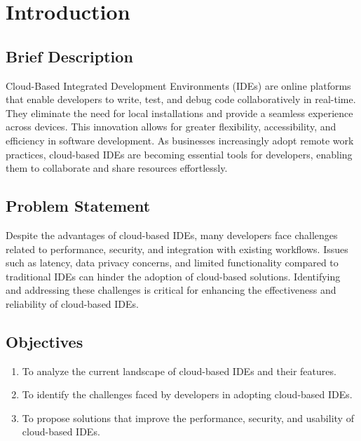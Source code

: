 \documentclass[12pt,a4paper,final]{report}
\begin{document}


\chapter{Introduction}
\thispagestyle{empty}
\newpage

\section{Brief Description}
Cloud-Based Integrated Development Environments (IDEs) are online platforms that enable developers to write, test, and debug code collaboratively in real-time. They eliminate the need for local installations and provide a seamless experience across devices. This innovation allows for greater flexibility, accessibility, and efficiency in software development. As businesses increasingly adopt remote work practices, cloud-based IDEs are becoming essential tools for developers, enabling them to collaborate and share resources effortlessly.

\section{Problem Statement}
Despite the advantages of cloud-based IDEs, many developers face challenges related to performance, security, and integration with existing workflows. Issues such as latency, data privacy concerns, and limited functionality compared to traditional IDEs can hinder the adoption of cloud-based solutions. Identifying and addressing these challenges is critical for enhancing the effectiveness and reliability of cloud-based IDEs.

\section{Objectives}
\begin{enumerate}
\item To analyze the current landscape of cloud-based IDEs and their features.
\item To identify the challenges faced by developers in adopting cloud-based IDEs.
\item To propose solutions that improve the performance, security, and usability of cloud-based IDEs.
\end{enumerate}
\end{document}
